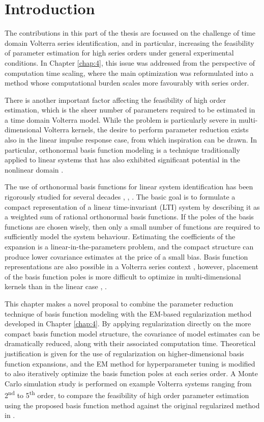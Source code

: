 \section{Introduction}

The contributions in this part of the thesis are focussed on the challenge of time domain Volterra series identification, and in particular, increasing the feasibility of parameter estimation for high series orders under general experimental conditions. In Chapter \ref{chap:4}, this issue was addressed from the perspective of computation time scaling, where the main optimization was reformulated into a method whose computational burden scales more favourably with series order.

There is another important factor affecting the feasibility of high order estimation, which is the sheer number of parameters required to be estimated in a time domain Volterra model. While the problem is particularly severe in multi-dimensional Volterra kernels, the desire to perform parameter reduction exists also in the linear impulse response case, from which inspiration can be drawn. In particular, orthonormal basis function modeling is a technique traditionally applied to linear systems \cite{Heuberger2005} that has also exhibited significant potential in the nonlinear domain \cite{Cheng2017}.

The use of orthonormal basis functions for linear system identification has been rigorously studied for several decades \cite{Heuberger2005}, \cite{Wahlberg1991}, \cite{Wahlberg1994}. The basic goal is to formulate a compact representation of a linear time-invariant (LTI) system by describing it as a weighted sum of rational orthonormal basis functions.  If the poles of the basis functions are chosen wisely, then only a small number of functions are required to sufficiently model the system behaviour.  Estimating the coefficients of the expansion is a linear-in-the-parameters problem, and the compact structure can produce lower covariance estimates at the price of a small bias. Basis function representations are also possible in a Volterra series context \cite{Rugh1980}, however, placement of the basis function poles is more difficult to optimize in multi-dimensional kernels than in the linear case \cite{Campello2004}, \cite{Rosa2007}. 

This chapter makes a novel proposal to combine the parameter reduction technique of basis function modeling with the EM-based regularization method developed in Chapter \ref{chap:4}. By applying regularization directly on the more compact basis function model structure, the covariance of model estimates can be dramatically reduced, along with their associated computation time. Theoretical justification is given for the use of regularization on higher-dimensional basis function expansions, and the EM method for hyperparameter tuning is modified to also iteratively optimize the basis function poles at each series order. A Monte Carlo simulation study is performed on example Volterra systems ranging from 2\textsuperscript{nd} to 5\textsuperscript{th} order, to compare the feasibility of high order parameter estimation using the proposed basis function method against the original regularized method in \cite{Birpoutsoukis2017}. 

